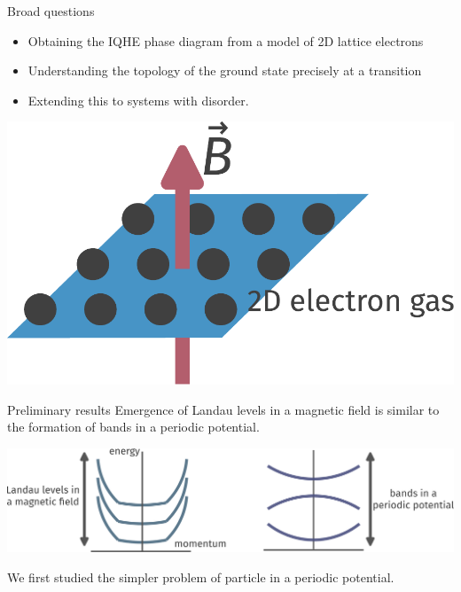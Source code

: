 \documentclass[aspectratio=169,t]{beamer}
\begin{document}
\begin{frame}{Broad questions}

\vspace*{\fill}
\begin{minipage}{0.5\textwidth}
\begin{itemize}[<+->]
	\item Obtaining the \alert{IQHE phase diagram} from a model of 2D lattice electrons\\[10pt]
	\item Understanding the \alert{topology} of the ground state precisely at a transition\\[10pt]
	\item Extending this to systems with \alert{disorder}.
\end{itemize}
\end{minipage}
\hspace*{\fill}
\begin{minipage}{0.4\textwidth}
\includegraphics[width=\textwidth]{IQHE.pdf}
\end{minipage}

\vspace*{\fill}
\end{frame}

\begin{frame}{Preliminary results}
Emergence of \alert{Landau levels} in a magnetic field is similar to the formation of \alert{bands} in a periodic potential.

\vspace*{\fill}
\includegraphics[width=\textwidth]{bands.pdf}

\vspace*{\fill}
We first studied the simpler problem of \alert{particle in a periodic potential}.
\end{frame}
\end{document}
